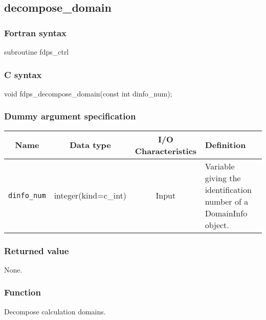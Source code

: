 \clearpage

\subsection{decompose\_domain}
\subsubsection*{Fortran syntax}
\begin{screen} 
\begin{spverbatim}
subroutine fdps_ctrl%
\end{spverbatim}
\end{screen}

\subsubsection*{C syntax}
\begin{screen}
\begin{spverbatim}
void fdps_decompose_domain(const int dinfo_num);
\end{spverbatim}
\end{screen}

\subsubsection*{Dummy argument specification}
\begin{table}[h]
\begin{tabularx}{\linewidth}{cccX}
\toprule
\rowcolor{Snow2}
Name & Data type & I/O Characteristics & Definition \\
\midrule
\texttt{dinfo\_num} & integer(kind=c\_int) & Input & Variable giving the identification number of a DomainInfo object.\\
\bottomrule
\end{tabularx}
\end{table}

\subsubsection*{Returned value}
None.

\subsubsection*{Function}
Decompose calculation domains.

\clearpage

